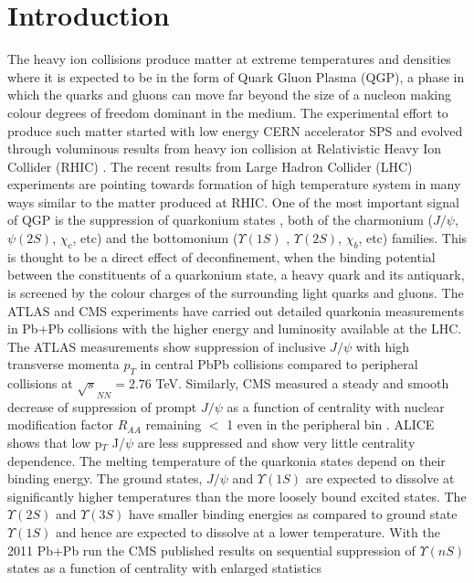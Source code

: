 \documentclass[aps,prc,preprint,superscriptaddress,showpacs,showkeys]{revtex4-1}
\begin{document}
\section{Introduction}
   The heavy ion collisions produce matter at extreme temperatures and densities where 
it is expected to be in the form of Quark Gluon Plasma 
(QGP), a phase in which the quarks and gluons can move far beyond  the size of a nucleon 
making colour degrees of freedom dominant in the medium. 
  The experimental effort to produce such matter started with low energy CERN accelerator 
SPS and evolved through voluminous results from heavy ion collision at Relativistic Heavy Ion 
Collider (RHIC) \cite{INTRO}.
 The recent results from Large Hadron Collider (LHC) experiments \cite{QGP_Tc} are 
pointing towards formation of high temperature system in many ways similar to the matter
produced at RHIC. 
  One of the most important signal of QGP is the suppression of 
quarkonium states \cite{SATZ}, both of the charmonium ($J/\psi$, $\psi(2S)$, $\chi_{c}$, etc) 
and the bottomonium ($\Upsilon(1S)$ , $\Upsilon(2S)$, $\chi_{b}$, etc) families. This is thought to be a 
direct effect of deconfinement, when the binding potential between the constituents of a quarkonium state, 
a heavy quark and its antiquark, is screened by the colour charges of the surrounding light quarks and gluons. 
  The ATLAS and CMS experiments have carried out detailed quarkonia measurements in Pb+Pb collisions 
with the higher energy and luminosity available at the LHC.
 The ATLAS measurements \cite{ATLAS} show suppression of inclusive $J/\psi$ with high transverse momenta $p_T$  
in central PbPb collisions compared to peripheral collisions at $\sqrt s_{NN} = 2.76$ TeV. 
  Similarly, CMS measured a steady and smooth decrease of suppression 
of prompt $J/\psi$ as a function of centrality with nuclear modification factor $R_{AA}$ remaining $<$ 1 even 
in the peripheral bin \cite{JCMS,CMSJPsi}. ALICE shows that low p$_T$ J/$\psi$ are less suppressed and show very 
little centrality dependence\cite{ALICEJPsi}.
  The melting temperature of the quarkonia states depend on their binding energy. The ground states, 
$J/\psi$ and $\Upsilon(1S)$ are expected to dissolve at significantly higher temperatures than the 
more loosely bound excited states. 
   The $\Upsilon(2S)$ and $\Upsilon(3S)$ have smaller binding energies as compared to ground
state $\Upsilon(1S)$ and hence are expected to dissolve at a lower temperature. 
 With the 2011 Pb+Pb run the CMS published results on sequential suppression of 
$\Upsilon(nS)$ states as a function of centrality \cite{CMSU2} with enlarged statistics
\end{document}
